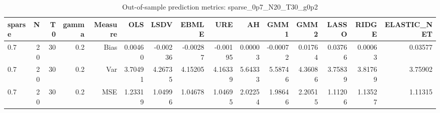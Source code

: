 \begin{table}[!htbp]\centering
\caption{Out-of-sample prediction metrics: sparse_0p7_N20_T30_g0p2}
\label{tab:table3_sparse_0p7_N20_T30_g0p2}
\begin{tabular}{lrrrrrrrrrrrrrr}
\hline
sparse & N & T0 & gamma & Measure & OLS & LSDV & EBMLE & URE & AH & GMM1 & GMM2 & LASSO & RIDGE & ELASTIC_NET \\
\hline
0.7 & 20 & 30 & 0.2 & Bias & 0.00460 & -0.00236 & -0.00287 & -0.00195 & 0.00003 & -0.00072 & 0.01764 & 0.03766 & 0.00063 & 0.03577 \\
0.7 & 20 & 30 & 0.2 & Var & 3.70491 & 4.26735 & 4.15205 & 4.16339 & 5.64333 & 5.58746 & 4.36086 & 3.75839 & 3.81769 & 3.75902 \\
0.7 & 20 & 30 & 0.2 & MSE & 1.23319 & 1.04996 & 1.04678 & 1.04695 & 2.02254 & 1.98646 & 2.20515 & 1.11206 & 1.13527 & 1.11315 \\
\hline
\end{tabular}
\end{table}

